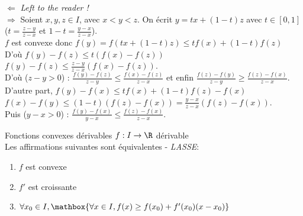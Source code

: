 \documentclass[12pt,a4paper]{report}
\begin{document}
\begin{demo}
$\Longleftarrow$ \textit{Left to the reader !} \\
$\Longrightarrow$ Soient $x,y,z \in I$, avec $x<y<z$. On écrit $y = tx + (1-t)z$ avec $t \in [0,1]$ ($t = \frac{z-y}{z-x}$ et $1-t = \frac{y-x}{z-x}$). \\
$f$ est convexe donc $f(y) = f(tx+(1-t)z) \le tf(x) + (1-t)f(z)$ \footnotemark \\
D'où $ f(y)-f(z) \le t(f(x)-f(z))$ \ie $f(y)-f(z) \le \frac{z-y}{z-x}(f(x)-f(z))$. \\
D'où ($z-y>0$) : $\frac{f(y)-f(z)}{z-y} \le \frac{f(x)-f(z)}{z-x}$ et enfin $\frac{f(z)-f(y)}{z-y} \ge \frac{f(z)-f(x)}{z-x}$. \\

D'autre part, $f(y)-f(x) \le tf(x) + (1-t)f(z) - f(x)$ \ie $f(x)-f(y) \le (1-t)(f(z)-f(x)) = \frac{y-x}{z-x}(f(z)-f(x))$. \\
Puis ($y-x>0$) : $\frac{f(y)-f(x)}{y-x} \le \frac{f(z)-f(x)}{z-x}$.
\end{demo}


\begin{theoreme}{Fonctions convexes dérivables}{}
$f:I\to \R$ dérivable\\
Les affirmations suivantes sont équivalentes - \textit{LASSE}:
\begin{enumerate}
    \item $f$ est convexe
    \item $f'$ est croissante
    \item $\forall x_0 \in I, \mathbox{\forall x \in I, f(x) \geq f(x_0)+f'(x_0)(x-x_0)}$ 
\end{enumerate}
\end{theoreme}
\end{document}
